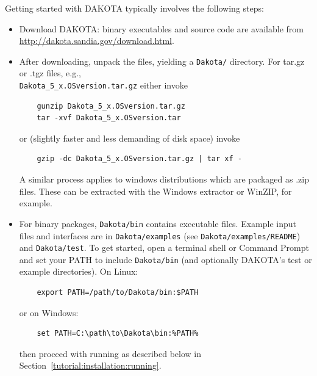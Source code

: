 Getting started with DAKOTA typically involves the following steps:
\begin{itemize}
  \item Download DAKOTA: binary executables and source code are
    available from\\
    \url{http://dakota.sandia.gov/download.html}.

  \item After downloading, unpack the files, yielding a {\tt Dakota/}
    directory.  For tar.gz or .tgz files, e.g.,\\
    \texttt{Dakota\_5\_x.OSversion.tar.gz} either invoke
    \begin{small}
\begin{verbatim}
    gunzip Dakota_5_x.OSversion.tar.gz
    tar -xvf Dakota_5_x.OSversion.tar
\end{verbatim}
    \end{small}
    or (slightly faster and less demanding of disk space) invoke
    \begin{small}
\begin{verbatim}
    gzip -dc Dakota_5_x.OSversion.tar.gz | tar xf -
\end{verbatim}
    \end{small}
    A similar process applies to windows distributions which are
    packaged as .zip files.  These can be extracted with the Windows
    extractor or WinZIP, for example.

  \item For binary packages, {\tt Dakota/bin} contains executable
    files. Example input files and interfaces are in
    \texttt{Dakota/examples} (see \texttt{Dakota/examples/README}) and
    \texttt{Dakota/test}.  To get started, open a terminal shell or
    Command Prompt and set your PATH to include {\tt Dakota/bin} (and
    optionally DAKOTA's test or example directories).  On Linux:
    \begin{small}
\begin{verbatim}
    export PATH=/path/to/Dakota/bin:$PATH
\end{verbatim} %
    \end{small}
    or on Windows:
    \begin{small}
\begin{verbatim}
    set PATH=C:\path\to\Dakota\bin:%PATH%
\end{verbatim}
    \end{small}
    then proceed with running as described below in 
    Section~\ref{tutorial:installation:running}.


\end{itemize}
